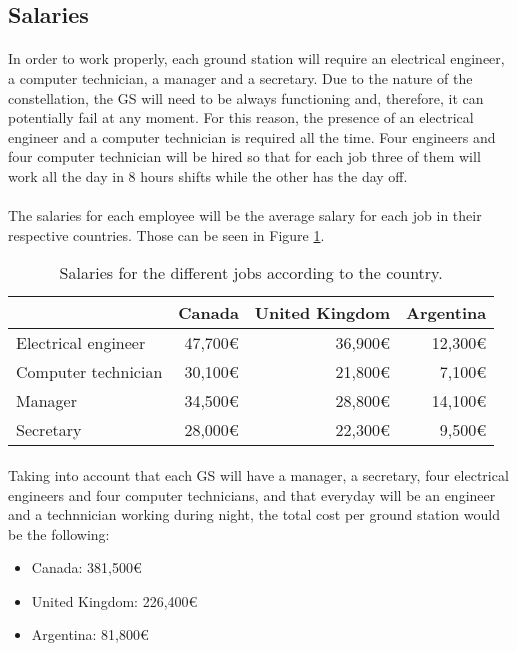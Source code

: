 \subsection{Salaries}

\paragraph{}In order to work properly, each ground station will require an electrical engineer, a computer technician, a manager and a secretary. Due to the nature of the constellation, the GS will need to be always functioning and, therefore, it can potentially fail at any moment. For this reason, the presence of an electrical engineer and a computer technician is required all the time. Four engineers and four computer technician will be hired so that for each job three of them will work all the day in 8 hours shifts while the other has the day off.

\paragraph{}The salaries for each employee will be the average salary for each job in their respective countries. Those can be seen in Figure \ref{table:Salaries}.

\begin{table}[H]
\begin{center}
\begin{tabular}{|l|r|r|r|}
\hline 
 & Canada & United Kingdom & Argentina \\ 
\hline 
Electrical engineer & 47,700\euro & 36,900\euro & 12,300\euro \\ 
\hline 
Computer technician & 30,100\euro & 21,800\euro & 7,100\euro \\ 
\hline 
Manager & 34,500\euro & 28,800\euro & 14,100\euro \\ 
\hline 
Secretary & 28,000\euro & 22,300\euro & 9,500\euro \\ 
\hline 
\end{tabular}
\end{center}
\caption[Salaries according to country]{Salaries for the different jobs according to the country.}
\label{table:Salaries}
\end{table}

\paragraph{}Taking into account that each GS will have a manager, a secretary, four electrical engineers and four computer technicians, and that everyday will be an engineer and a technnician working during night, the total cost per ground station would be the following:
\begin{itemize}
\item Canada: 381,500\euro
\item United Kingdom: 226,400\euro
\item Argentina: 81,800\euro
\end{itemize}

